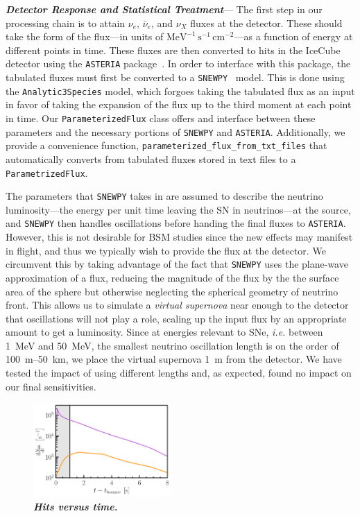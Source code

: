 \textbf{\textit{Detector Response and Statistical Treatment}}---
The first step in our processing chain is to attain $\nu_{e}$, $\bar{\nu}_{e}$, and $\nu_{X}$ fluxes at the detector.
These should take the form of the flux---in units of $\mathrm{MeV}^{-1}\,\mathrm{s}^{-1}\,\mathrm{cm}^{-2}$---as a function of energy at different points in time.
These fluxes are then converted to hits in the IceCube detector using the \texttt{ASTERIA} package~\cite{ASTERIA}.
In order to interface with this package, the tabulated fluxes must first be converted to a \texttt{SNEWPY}~\cite{SNEWS:2021ewj} model.
This is done using the \texttt{Analytic3Species} model, which forgoes taking the tabulated flux as an input in favor of taking the expansion of the flux up to the third moment at each point in time.
Our \texttt{ParameterizedFlux} class offers and interface between these parameters and the necessary portions of \texttt{SNEWPY} and \texttt{ASTERIA}.
Additionally, we provide a convenience function, \texttt{parameterized\_flux\_from\_txt\_files} that automatically converts from tabulated fluxes stored in text files to a \texttt{ParametrizedFlux}.

The parameters that \texttt{SNEWPY} takes in are assumed to describe the neutrino luminosity---the energy per unit time leaving the SN in neutrinos---at the source, and \texttt{SNEWPY} then handles oscillations before handing the final fluxes to \texttt{ASTERIA}.
However, this is not desirable for BSM studies since the new effects may manifest in flight, and thus we typically wish to provide the flux at the detector.
We circumvent this by taking advantage of the fact that \texttt{SNEWPY} uses the plane-wave approximation of a flux, reducing the magnitude of the flux by the the surface area of the sphere but otherwise neglecting the spherical geometry of neutrino front.
This allows us to simulate a \textit{virtual supernova} near enough to the detector that oscillations will not play a role, scaling up the input flux by an appropriate amount to get a luminosity.
Since at energies relevant to SNe, \textit{i.e.} between 1~MeV and 50~MeV, the smallest neutrino oscillation length is on the order of 100~m--50~km, we place the virtual supernova 1~m from the detector.
We have tested the impact of using different lengths and, as expected, found no impact on our final sensitivities.

\begin{figure}[t!]
    \centering
    \includegraphics[width=0.47\textwidth]{figures/100MeV_HNL_hits-v-time.pdf}
    \caption{\textbf{\textit{Hits versus time.}}}
    \label{fig:hvt_100MeV}
\end{figure}

